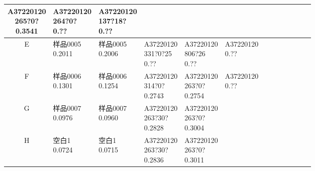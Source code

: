\documentclass[UTF8,10pt,a4paper,fontset=fandol]{ctexart}
\begin{document}
\begin{center}
\begin{tabular}{|c|*{12}{p{0.58cm}|}}
\shortstack{A37220120\\265?0?\\0.3541} &
\shortstack{A37220120\\264?0?\\0.??} &
\shortstack{A37220120\\137?18?\\0.??} &
& & & & &\\
\hline
E &
\shortstack{样品0005\\0.2011} &
\shortstack{样品0005\\0.2006} &
\shortstack{A37220120\\331?0?25\\0.??} &
\shortstack{A37220120\\806?26\\0.??} &
\shortstack{A37220120\\0.??} &
& & & & & &\\
\hline
F &
\shortstack{样品0006\\0.1301} &
\shortstack{样品0006\\0.1254} &
\shortstack{A37220120\\314?0?\\0.2743} &
\shortstack{A37220120\\263?0?\\0.2754} &
\shortstack{A37220120\\0.??} &
& & & & & &\\
\hline
G &
\shortstack{样品0007\\0.0976} &
\shortstack{样品0007\\0.0960} &
\shortstack{A37220120\\263?30?\\0.2828} &
\shortstack{A37220120\\263?0?\\0.3004} &
& & & & & & &\\
\hline
H &
\shortstack{空白1\\0.0724} &
\shortstack{空白1\\0.0715} &
\shortstack{A37220120\\263?30?\\0.2836} &
\shortstack{A37220120\\263?0?\\0.3011} &
& & & & & & &\\
\hline
\end{tabular}
\end{center}

\end{document}
